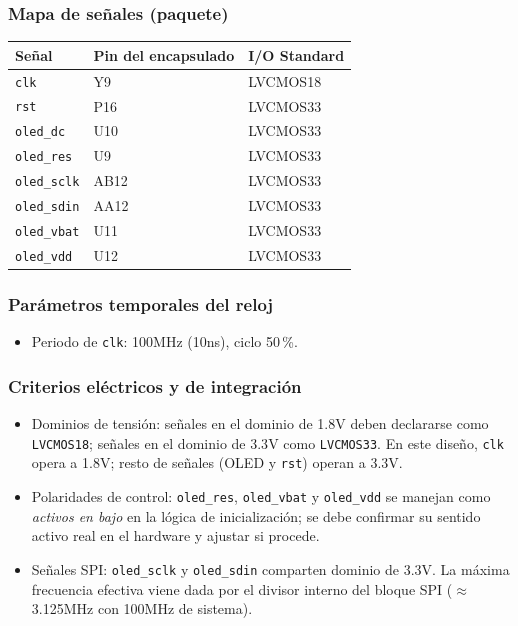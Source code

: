 \documentclass[a4paper,12pt]{article}
\begin{document}
\subsubsection*{Mapa de señales \texorpdfstring{(paquete)}{}}
\begin{center}
\begin{tabular}{l l l}
\hline
\textbf{Señal} & \textbf{Pin del encapsulado} & \textbf{I/O Standard} \\
\hline
\texttt{clk}        & Y9   & LVCMOS18 \\
\texttt{rst}        & P16  & LVCMOS33 \\
\texttt{oled\_dc}   & U10  & LVCMOS33 \\
\texttt{oled\_res}  & U9   & LVCMOS33 \\
\texttt{oled\_sclk} & AB12 & LVCMOS33 \\
\texttt{oled\_sdin} & AA12 & LVCMOS33 \\
\texttt{oled\_vbat} & U11  & LVCMOS33 \\
\texttt{oled\_vdd}  & U12  & LVCMOS33 \\
\hline
\end{tabular}
\end{center}

\subsubsection*{Parámetros temporales del reloj}
\begin{itemize}
  \item Periodo de \texttt{clk}: {100}{MHz} ({10}{ns}), ciclo 50\,\%.
\end{itemize}

\subsubsection*{Criterios eléctricos y de integración}
\begin{itemize}
  \item Dominios de tensión: señales en el dominio de {1.8}{V} deben declararse como \texttt{LVCMOS18}; señales en el dominio de {3.3}{V} como \texttt{LVCMOS33}. En este diseño, \texttt{clk} opera a {1.8}{V}; resto de señales (OLED y \texttt{rst}) operan a {3.3}{V}.
  \item Polaridades de control: \texttt{oled\_res}, \texttt{oled\_vbat} y \texttt{oled\_vdd} se manejan como \emph{activos en bajo} en la lógica de inicialización; se debe confirmar su sentido activo real en el hardware y ajustar si procede.
  \item Señales SPI: \texttt{oled\_sclk} y \texttt{oled\_sdin} comparten dominio de {3.3}{V}. La máxima frecuencia efectiva viene dada por el divisor interno del bloque SPI (\(\approx\) {3.125}{MHz} con {100}{MHz} de sistema).
\end{itemize}
\end{document}
